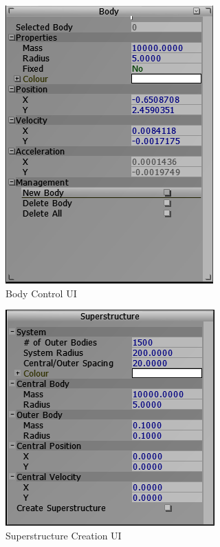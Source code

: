 \begin{figure}[h]
  \centering
  \includegraphics[scale=0.6]{../img/bodyUI.png} 
  \caption{Body Control UI}
\end{figure}

\begin{figure}[ht]
  \centering
  \includegraphics[scale=0.7]{../img/superstructureUI.png} 
  \caption{Superstructure Creation UI}
\end{figure}

\pagebreak